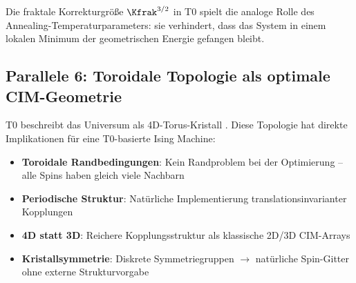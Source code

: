 \begin{table}[h]
    \centering
    \caption{Parallele 5: Fraktale Korrektur und Annealing}
    \label{tab:parallel5}
\end{table}

Die fraktale Korrekturgröße $\Kfrak^{3/2}$ in T0 spielt die analoge Rolle des 
Annealing-Temperaturparameters: sie verhindert, dass das System in einem lokalen 
Minimum der geometrischen Energie gefangen bleibt.

\subsection{Parallele 6: Toroidale Topologie als optimale CIM-Geometrie}

T0 beschreibt das Universum als 4D-Torus-Kristall \cite{pascher_torus_2025}. 
Diese Topologie hat direkte Implikationen für eine T0-basierte Ising Machine:

\begin{itemize}
    \item \textbf{Toroidale Randbedingungen}: Kein Randproblem bei der Optimierung -- 
    alle Spins haben gleich viele Nachbarn
    \item \textbf{Periodische Struktur}: Natürliche Implementierung 
    translationsinvarianter Kopplungen
    \item \textbf{4D statt 3D}: Reichere Kopplungsstruktur als klassische 2D/3D 
    CIM-Arrays
    \item \textbf{Kristallsymmetrie}: Diskrete Symmetriegruppen $\rightarrow$ 
    natürliche Spin-Gitter ohne externe Strukturvorgabe
\end{itemize}

